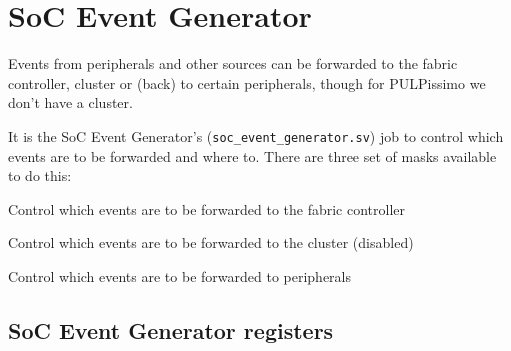 \section{SoC Event Generator}

Events from peripherals and other sources can be forwarded to the
fabric controller, cluster or (back) to certain peripherals, though for
PULPissimo we don't have a cluster.

It is the SoC Event Generator's (\texttt{soc\_event\_generator.sv}) job to control which events are to be forwarded and where to.
There are three set of masks available to do this:
\begin{enumerate}[leftmargin=\widthof{[Peripheral Masks]}+\labelsep]
  \item[FC Masks] Control which events are to be forwarded to the fabric controller
  \item[Cluster Masks] Control which events are to be forwarded to the cluster (disabled)
  \item[Peripheral Masks] Control which events are to be forwarded to peripherals
\end{enumerate}



\subsection{SoC Event Generator registers}

